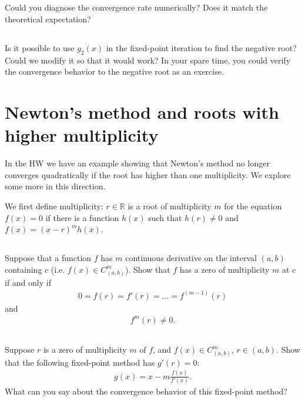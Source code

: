 \documentclass[11pt,letterpaper]{article}
\begin{document}
\subsection{}
Could you diagnose the convergence rate numerically? Does it match the theoretical expectation?

\subsection{}
Is it possible to use $g_2(x)$ in the fixed-point iteration to find the negative root? Could we modify it so that it would work? In your spare time, you could verify the convergence behavior to the negative root as an exercise. 

\newpage
\section{Newton's method and roots with higher multiplicity}
In the HW we have an example showing that Newton's method no longer converges quadratically if the root has higher than one multiplicity. We explore some more in this direction.

We first define multiplicity: $r\in \mathbb{R}$ is a root of multiplicity $m$ for the equation $f(x)=0$ if there is a function $h(x)$ such that $h(r)\neq 0$ and $f(x) = (x-r)^m h(x)$.

\subsection{}
Suppose that a function $f$ has $m$ continuous derivative on the interval $(a,b)$ containing $c$ (i.e. $f(x)\in C^m_{(a,b)}$). Show that $f$ has a zero of multiplicity $m$ at $c$ if and only if
\begin{align*}
    0 = f(r) = f'(r) = \dots = f^{(m-1)}(r)
\end{align*}
and
\begin{align*}
    f^{m}(r) \neq 0.
\end{align*}

\subsection{}
Suppose $r$ is a zero of multiplicity $m$ of $f$, and $f(x)\in C^m_{(a,b)}$, $r\in (a,b)$. Show that the following fixed-point method has $g'(r) = 0$:
\begin{align*}
    g(x) = x-m\frac{f(x)}{f'(x)}.
\end{align*}
What can you say about the convergence behavior of this fixed-point method?
\end{document}
